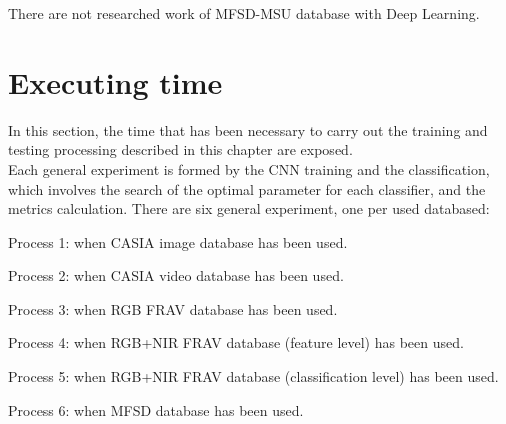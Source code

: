 \begin{table}[]
\centering
{}
\caption{Comparative among proposed models and literature work.}
\label{table_literature_comp}
\end{table}
There are not researched work of MFSD-MSU database with Deep Learning.

\section{Executing time}
In this section, the time that has been necessary to carry out the training and testing processing described in this chapter  are exposed.\\

Each general experiment is formed by the CNN training and the classification, which involves the search of the optimal parameter for each classifier, and the metrics calculation. There are six general experiment, one per used databased:
\begin{description}[itemsep=2pt,topsep=8pt,parsep=0pt,partopsep=20pt]
 \item Process 1: when CASIA image database has been used.
 \item Process 2: when CASIA video database has been used.
 \item Process 3: when RGB FRAV database has been used.
 \item Process 4: when RGB+NIR FRAV database (feature level) has been used.
 \item Process 5: when RGB+NIR FRAV database (classification level) has been used.
 \item Process 6: when MFSD database has been used.
\end{description}


